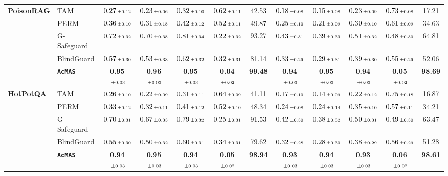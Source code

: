 \documentclass{article}
\newcommand{\pmstd}[1]{\text{{\fontsize{6}{6}\selectfont$\pm #1$}}}
\newcommand{\app}{\texttt{AcMAS}}
\theoremstyle{plain}
\theoremstyle{definition}
\theoremstyle{remark}
\begin{document}
\begin{table}[h]
{\begin{tabular}{l | l | ccccc | ccccc}
\multirow{5}{*}{\textbf{PoisonRAG}}
& TAM
& $0.27\,\pmstd{0.12}$ & $0.23\,\pmstd{0.06}$ & $0.32\,\pmstd{0.10}$ & $0.62\,\pmstd{0.11}$ & 42.53
& $0.18\,\pmstd{0.08}$ & $0.15\,\pmstd{0.08}$ & $0.23\,\pmstd{0.09}$ & $0.73\,\pmstd{0.08}$ & 17.21 \\
& PERM
& $0.36\,\pmstd{0.10}$ & $0.31\,\pmstd{0.15}$ & $0.42\,\pmstd{0.12}$ & $0.52\,\pmstd{0.11}$ & 49.87
& $0.25\,\pmstd{0.10}$ & $0.21\,\pmstd{0.09}$ & $0.30\,\pmstd{0.10}$ & $0.61\,\pmstd{0.09}$ & 34.63 \\
& G-Safeguard
& $0.72\,\pmstd{0.32}$ & $0.70\,\pmstd{0.35}$ & $0.81\,\pmstd{0.34}$ & $0.22\,\pmstd{0.32}$ & 93.27
& $0.43\,\pmstd{0.31}$ & $0.39\,\pmstd{0.33}$ & $0.51\,\pmstd{0.32}$ & $0.48\,\pmstd{0.30}$ & 64.81 \\
& BlindGuard
& $0.57\,\pmstd{0.30}$ & $0.53\,\pmstd{0.33}$ & $0.62\,\pmstd{0.32}$ & $0.32\,\pmstd{0.31}$ & 81.14
& $0.33\,\pmstd{0.29}$ & $0.29\,\pmstd{0.31}$ & $0.39\,\pmstd{0.30}$ & $0.55\,\pmstd{0.29}$ & 52.06 \\
& \textbf{\app{}}
& \textbf{0.95}$\,\pmstd{0.03}$ & \textbf{0.96}$\,\pmstd{0.03}$ & \textbf{0.95}$\,\pmstd{0.03}$ & \textbf{0.04}$\,\pmstd{0.02}$ & \textbf{99.48}
& \textbf{0.94}$\,\pmstd{0.03}$ & \textbf{0.95}$\,\pmstd{0.03}$ & \textbf{0.94}$\,\pmstd{0.03}$ & \textbf{0.05}$\,\pmstd{0.02}$ & \textbf{98.69} \\
\midrule

\multirow{5}{*}{\textbf{HotPotQA}}
& TAM
& $0.26\,\pmstd{0.10}$ & $0.22\,\pmstd{0.09}$ & $0.31\,\pmstd{0.11}$ & $0.64\,\pmstd{0.09}$ & 41.11
& $0.17\,\pmstd{0.10}$ & $0.14\,\pmstd{0.09}$ & $0.22\,\pmstd{0.12}$ & $0.75\,\pmstd{0.18}$ & 16.87 \\
& PERM
& $0.33\,\pmstd{0.12}$ & $0.32\,\pmstd{0.11}$ & $0.41\,\pmstd{0.12}$ & $0.52\,\pmstd{0.10}$ & 48.34
& $0.24\,\pmstd{0.08}$ & $0.24\,\pmstd{0.14}$ & $0.35\,\pmstd{0.10}$ & $0.57\,\pmstd{0.11}$ & 34.21 \\
& G-Safeguard
& $0.70\,\pmstd{0.31}$ & $0.67\,\pmstd{0.33}$ & $0.79\,\pmstd{0.32}$ & $0.25\,\pmstd{0.31}$ & 91.53
& $0.42\,\pmstd{0.30}$ & $0.38\,\pmstd{0.32}$ & $0.50\,\pmstd{0.31}$ & $0.49\,\pmstd{0.30}$ & 63.47 \\
& BlindGuard
& $0.55\,\pmstd{0.30}$ & $0.50\,\pmstd{0.32}$ & $0.60\,\pmstd{0.31}$ & $0.34\,\pmstd{0.31}$ & 79.62
& $0.32\,\pmstd{0.28}$ & $0.28\,\pmstd{0.30}$ & $0.38\,\pmstd{0.29}$ & $0.56\,\pmstd{0.29}$ & 51.28 \\
& \textbf{\app{}}
& \textbf{0.94}$\,\pmstd{0.03}$ & \textbf{0.95}$\,\pmstd{0.03}$ & \textbf{0.94}$\,\pmstd{0.03}$ & \textbf{0.05}$\,\pmstd{0.02}$ & \textbf{98.94}
& \textbf{0.93}$\,\pmstd{0.03}$ & \textbf{0.94}$\,\pmstd{0.03}$ & \textbf{0.93}$\,\pmstd{0.03}$ & \textbf{0.06}$\,\pmstd{0.02}$ & \textbf{98.61} \\
\bottomrule
\end{tabular}
}%
\end{table}
\end{document}
